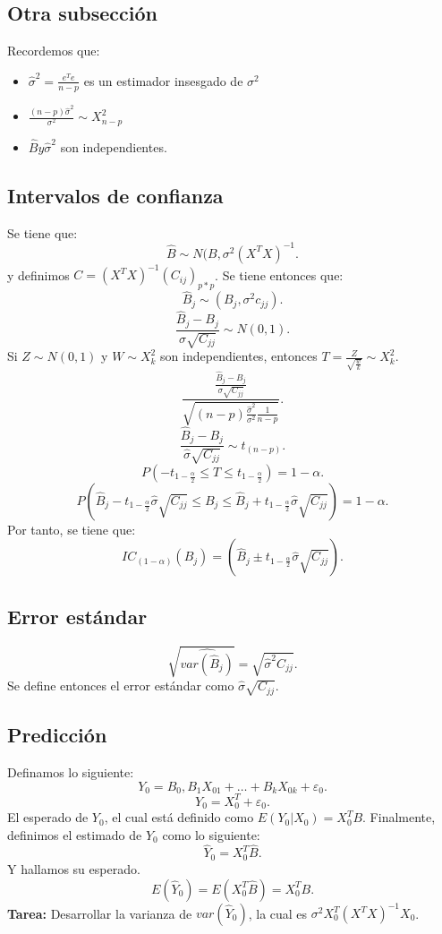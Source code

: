 \documentclass{article}
\begin{document}
\subsection{Otra subsección}
Recordemos que:
\begin{itemize}
	\item $\hat{\sigma}^{2} = \frac{e^{T}e}{n-p}$ es un estimador insesgado de $\sigma^{2}$
	\item $\frac{(n-p)\hat{\sigma}^{2}}{\sigma^{2}} \sim X^{2}_{n-p}$
	\item $\hat{B} y \hat{\sigma}^{2}$ son independientes.
\end{itemize}

\subsection{Intervalos de confianza}
Se tiene que:
\[ \hat{B}\sim N(B,\sigma^{2}(X^{T}X)^{-1} .\]
y definimos $C=(X^{T}X)^{-1}(C_{ij})_{p*p}$. Se tiene entonces que:
\[ \hat{B}_{j} \sim (B_{j},\sigma^{2}c_{jj}) .\]
\[ \frac{\hat{B}_{j}-B_{j}}{\sigma \sqrt{C_{jj}}} \sim N(0,1) .\]
Si $Z \sim  N(0,1)$ y $W \sim X^{2}_{k}$ son independientes, entonces $T=\frac{Z}{\sqrt{\frac{w}{k}}}\sim X^{2}_{k}$.
\[ \frac{\frac{\hat{B}_{j}-B_{j}}{\sigma\sqrt{C_{jj}}}}{\sqrt{(n-p)\frac{\hat{\sigma}^{2}}{\sigma^{2}}\frac{1}{n-p}}} .\]
\[ \frac{\hat{B}_{j}-B_{j}}{\hat{\sigma}\sqrt{C_{jj}}} \sim t_{(n-p)}.\]
\[ P(-t_{1-\frac{\alpha}{2}}\leq T \leq t_{1-\frac{\alpha}{2}})=1-\alpha .\]
\[ P(\hat{B}_{j}-t_{1-\frac{\alpha}{2}}\hat{\sigma}\sqrt{C_{jj}} \leq B_{j} \leq \hat{B}_{j}+t_{1-\frac{\alpha}{2}}\hat{\sigma}\sqrt{C_{jj}})=1-\alpha .\]
Por tanto, se tiene que:
\[ IC_{(1-\alpha)}(B_{j}) = (\hat{B}_{j} \pm t_{1-\frac{\alpha}{2}}\hat{\sigma}\sqrt{C_{jj}}) .\]

\subsection{Error estándar}
\[ \sqrt{\hat{var(\hat{B}_{j})}} = \sqrt{\hat{\sigma}^{2}C_{jj}} .\]
Se define entonces el error estándar como $\hat{\sigma}\sqrt{C_{jj}}$.

\subsection{Predicción}
Definamos lo siguiente:
\[ Y_{0}= B_{0},B_{1}X_{01}+ \ldots + B_{k}X_{0k}+\varepsilon_{0} .\]
\[ Y_{0}=X_{0}^{T}+\varepsilon_{0} .\]
El esperado de $Y_{0}$, el cual está definido como $E(Y_{0}|X_{0})=X_{0}^{T}B$. Finalmente, definimos el estimado de $Y_{0}$ como lo siguiente:
\[ \hat{Y}_{0} = X_{0}^{T}\hat{B} .\]
Y hallamos su esperado.
\[ E(\hat{Y}_{0})=E(X_{0}^{T}\hat{B})=X_{0}^{T}B .\]
\textbf{Tarea:} Desarrollar la varianza de $var(\hat{Y}_{0})$, la cual es $\sigma^{2} X_{0}^{T}(X^{T}X)^{-1}X_{0}$.
\end{document}
